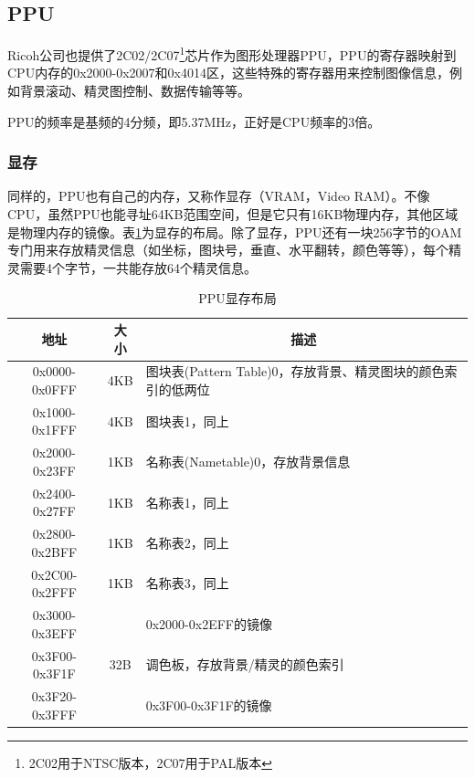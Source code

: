 \documentclass[a4paper]{ltxdoc}
\begin{document}
{\subsection{PPU}
Ricoh公司也提供了2C02/2C07\footnote{2C02用于NTSC版本，2C07用于PAL版本}芯片作为图形处理器PPU，PPU的寄存器映射到CPU内存的0x2000-0x2007和0x4014区，这些特殊的寄存器用来控制图像信息，例如背景滚动、精灵图控制、数据传输等等。

PPU的频率是基频的4分频，即5.37MHz，正好是CPU频率的3倍。

\subsubsection{显存}
同样的，PPU也有自己的内存，又称作显存（VRAM，Video RAM）。不像CPU，虽然PPU也能寻址64KB范围空间，但是它只有16KB物理内存，其他区域是物理内存的镜像。表\ref{tab:vram}为显存的布局。除了显存，PPU还有一块256字节的OAM专门用来存放精灵信息（如坐标，图块号，垂直、水平翻转，颜色等等），每个精灵需要4个字节，一共能存放64个精灵信息。

\begin{table}[h]
\centering
\caption{PPU显存布局}
\label{tab:vram}
\begin{tabularx}{\textwidth}{|c|c|X|}
\hline
\rowcolor[HTML]{8DCDFF}
地址          & 大小  & \multicolumn{1}{c|}{\cellcolor[HTML]{8DCDFF}描述} \\ \hline
0x0000-0x0FFF & 4KB & 图块表(Pattern Table)0，存放背景、精灵图块的颜色索引的低两位                       \\ \hline
0x1000-0x1FFF & 4KB & 图块表1，同上                              \\ \hline
0x2000-0x23FF & 1KB & 名称表(Nametable)0，存放背景信息                              \\ \hline
0x2400-0x27FF & 1KB & 名称表1，同上                                  \\ \hline
0x2800-0x2BFF & 1KB & 名称表2，同上                                  \\ \hline
0x2C00-0x2FFF & 1KB & 名称表3，同上                                  \\ \hline
0x3000-0x3EFF &     & 0x2000-0x2EFF的镜像                                  \\ \hline
0x3F00-0x3F1F & 32B & 调色板，存放背景/精灵的颜色索引                            \\ \hline
0x3F20-0x3FFF &     & 0x3F00-0x3F1F的镜像                                  \\ \hline
\end{tabularx}
\end{table}

}
\end{document}
